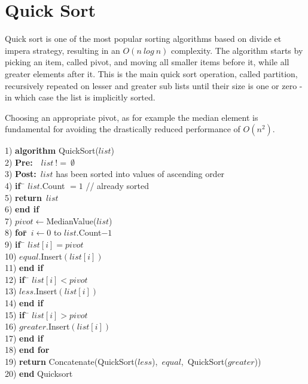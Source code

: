 \newpage
\section{Quick Sort} 
Quick sort is one of the most popular sorting algorithms based on divide et impera strategy, resulting in an $O(n~log~n)$ complexity. The algorithm starts by picking an item, called pivot, and moving all smaller items before it, while all greater elements after it. This is the main quick sort operation, called partition, recursively repeated on lesser and greater sub lists until their size  is one or zero - in which case the list is implicitly sorted.

Choosing an appropriate pivot, as for example the median element is fundamental for avoiding the drastically reduced performance of $O(n^{2})$.

\begin{tabbing}
1)  \textbf{alg}\= \textbf{orithm} QuickSort($list$) \\
2)  \> \textbf{Pre:}~~$list~!=~\emptyset$ \\
3)  \> \textbf{Post:}~$list$ has been sorted into values of ascending order \\
4)  \> \textbf{if}~\= $list$.Count $= 1$ // already sorted \\
5)  \> \> \textbf{return}~$list$ \\
6)  \> \textbf{end if} \\
7)  \> $pivot \leftarrow $MedianValue($list$) \\
8)  \> \textbf{for}\=~$i \leftarrow 0$ to $list$.Count$-1$ \\
9)  \> \> \textbf{if}~\= $list[i] = pivot$ \\
10) \> \> \> $equal$.Insert$(list[i])$\\
11) \> \> \textbf{end if} \\
12) \> \> \textbf{if}~\= $list[i] < pivot$ \\
13) \> \> \> $less$.Insert$(list[i])$\\
14) \> \> \textbf{end if} \\
15) \> \> \textbf{if}~\= $list[i] > pivot$ \\
16) \> \> \> $greater$.Insert$(list[i])$\\
17) \> \> \textbf{end if} \\
18) \> \textbf{end for} \\
19) \> \textbf{return} Concatenate(QuickSort($less$),~$equal$,~QuickSort($greater$)) \\
20) \textbf{end} Quicksort \\
\end{tabbing}

